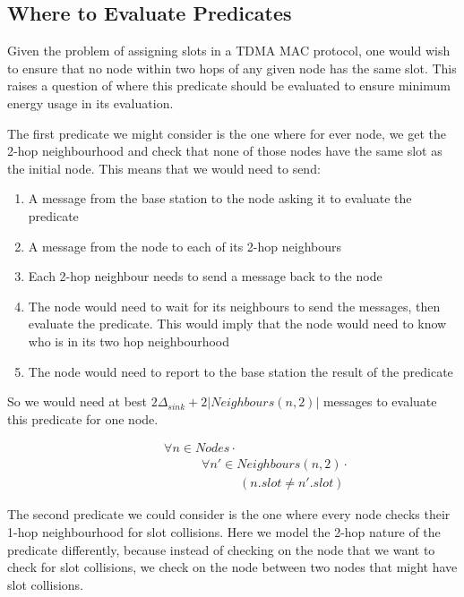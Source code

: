 \subsection{Where to Evaluate Predicates}

Given the problem of assigning slots in a TDMA MAC protocol, one would wish to ensure that no node within two hops of any given node has the same slot. This raises a question of where this predicate should be evaluated to ensure minimum energy usage in its evaluation.

The first predicate we might consider is the one where for ever node, we get the 2-hop neighbourhood and check that none of those nodes have the same slot as the initial node. This means that we would need to send:
\begin{enumerate}
	\item A message from the base station to the node asking it to evaluate the predicate
	\item A message from the node to each of its 2-hop neighbours
	\item Each 2-hop neighbour needs to send a message back to the node
	\item The node would need to wait for its neighbours to send the messages, then evaluate the predicate. This would imply that the node would need to know who is in its two hop neighbourhood
	\item The node would need to report to the base station the result of the predicate
\end{enumerate}

So we would need at best $2\Delta_{sink} + 2|Neighbours(n, 2)|$ messages to evaluate this predicate for one node.

\begin{align}
\label{eq:2-hop-slot-pred}
& \hspace{3em}	\forall n \in Nodes \cdot \\
& \hspace{6em}		\forall n' \in Neighbours(n, 2) \cdot \\
& \hspace{9em}			(n.slot \neq n'.slot)
\end{align}


The second predicate we could consider is the one where every node checks their 1-hop neighbourhood for slot collisions. Here we model the 2-hop nature of the predicate differently, because instead of checking on the node that we want to check for slot collisions, we check on the node between two nodes that might have slot collisions.

